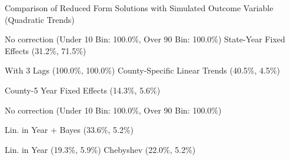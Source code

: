 \caption{Comparison of Reduced Form Solutions with Simulated Outcome Variable (Quadratic Trends) \label{fig:distributions-existing-solutions}}
\caption*{\color{p1line}{\textbf{\textemdash\textemdash}} No correction (Under 10 Bin: 100.0\%, Over 90 Bin: 100.0\%) \hspace{1cm} \color{p2line}{- - -} State-Year Fixed Effects (31.2\%, 71.5\%)}
\caption*{\color{p3line}{\textbf{- - -}} With 3 Lags (100.0\%, 100.0\%) \hspace{1cm} \color{p4line}{\textbf{- - -}} County-Specific Linear Trends (40.5\%, 4.5\%)}
\caption*{\color{p5line}{\textbf{- - -}} County-5 Year Fixed Effects (14.3\%, 5.6\%)}


\caption*{\color{p1line}{\textbf{\textemdash\textemdash}} No correction (Under 10 Bin: 100.0\%, Over 90 Bin: 100.0\%)}
\caption*{\color{p2line}{\textbf{- - -}} Lin. in Year + Bayes (33.6\%, 5.2\%)}
\caption*{\color{p3line}{\textbf{- - -}} Lin. in Year (19.3\%, 5.9\%) \hspace{1cm} \color{p4line}{\textbf{- - -}} Chebyshev (22.0\%, 5.2\%)}